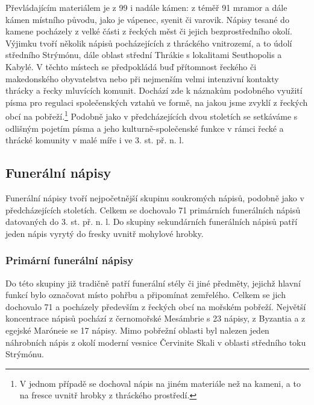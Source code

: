 Převládajícím materiálem je z 99  i nadále kámen: z téměř 91  mramor a dále kámen místního původu, jako je vápenec, syenit či varovik. Nápisy tesané do kamene pocházely z velké části z řeckých měst či jejich bezprostředního okolí. Výjimku tvoří několik nápisů pocházejících z thráckého vnitrozemí, a to údolí středního Strýmónu, dále oblast střední Thrákie s lokalitami Seuthopolis a Kabylé. V těchto místech se předpokládá buď přítomnost řeckého či makedonského obyvatelstva nebo při nejmenším velmi intenzivní kontakty thrácky a řecky mluvících komunit. Dochází zde k náznakům podobného využití písma pro regulaci společenských vztahů ve formě, na jakou jsme zvyklí z řeckých obcí na pobřeží.\footnote{V jednom případě se dochoval nápis na jiném materiále než na kameni, a to na fresce uvnitř hrobky z thráckého prostředí.} Podobně jako v předcházejících dvou stoletích se setkáváme s odlišným pojetím písma a jeho kulturně-společenské funkce v rámci řecké a thrácké komunity v malé míře i ve 3. st. př. n. l.

\subsection[funerální-nápisy-5]{Funerální nápisy}

Funerální nápisy tvoří nejpočetnější skupinu soukromých nápisů, podobně jako v předcházejících stoletích. Celkem se dochovalo 71 primárních funerálních nápisů datovaných do 3. st. př. n. l. Do skupiny sekundárních funerálních nápisů patří jeden nápis vyrytý do fresky uvnitř mohylové hrobky.

\subsubsection[primární-funerální-nápisy-2]{Primární funerální nápisy}

Do této skupiny již tradičně patří funerální stély či jiné předměty, jejichž hlavní funkcí bylo označovat místo pohřbu a připomínat zemřelého. Celkem se jich dochovalo 71 a pocházely především z řeckých obcí na mořském pobřeží. Největší koncentrace nápisů pochází z černomořské Mesámbrie s 23 nápisy, z Byzantia a z egejské Maróneie se 17 nápisy. Mimo pobřežní oblasti byl nalezen jeden náhrobních nápis z okolí moderní vesnice Červinite Skali v oblasti středního toku Strýmónu.

